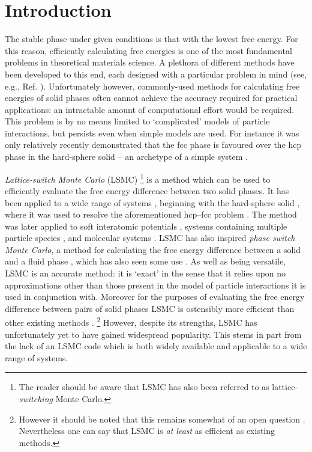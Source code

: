 \documentclass{report}
\begin{document}
\chapter{Introduction}
The stable phase under given conditions is that with the lowest free energy. For this reason, efficiently calculating free energies is one 
of the most fundamental problems in theoretical materials science. A plethora of different methods have been developed to this end, 
each designed with a particular problem in mind (see, e.g., Ref. \cite{book:Frenkel}). Unfortunately however, commonly-used methods for 
calculating free energies of solid phases often cannot achieve the accuracy required for practical applications: an intractable amount of computational 
effort would be required. This problem is by no means limited to `complicated' models of particle interactions, but 
persists even when simple models are used. For instance it was only relatively recently demonstrated that the fcc phase is
favoured over the hcp phase in the hard-sphere solid -- an archetype of a simple system \cite{Bruce_1997,Bruce_2000,Jackson_2002}.

\emph{Lattice-switch Monte Carlo} (LSMC) \cite{Bruce_1997,Bruce_2000} 
\footnote{The reader should be aware that LSMC has also been referred to as lattice-\emph{switching} Monte Carlo.}
is a method which can be used to efficiently evaluate the free energy difference between two solid phases.
It has been applied to a wide range of systems \cite{Bruce_1997,Pronk_1999,Mau_1999,Bruce_2000,Jackson_2002,Jackson_2007,Yang_2008,
Marechal_2008,Raiteri_2010,Wilms_2012,Quigley_2014,Bridgwater_2014,Underwood_2015},
beginning with the hard-sphere solid \cite{Bruce_1997,Pronk_1999,Mau_1999,Bruce_2000}, where it was used to resolve the aforementioned hcp--fcc problem 
\cite{Bruce_1997,Bruce_2000}. The method was later applied to soft interatomic potentials \cite{Jackson_2002,Wilms_2012,Underwood_2015}, 
systems containing multiple particle species \cite{Jackson_2007,Yang_2008}, and molecular systems 
\cite{Marechal_2008,Raiteri_2010,Quigley_2014,Bridgwater_2014}.
LSMC has also inspired \emph{phase switch Monte Carlo}, a method for calculating the free energy difference between a solid and a
fluid phase \cite{Wilding_2000}, which has also seen some use
\cite{Wilding_2000,Errington_2004,McNeil-Watson_2006,Wilding_2009_MP,Wilding_2009_JCP,Sollich_2010,Wilding_2010}.
%
As well as being versatile, LSMC is an accurate method: it is `exact' in the sense that it relies upon no approximations other than those present in 
the model of particle interactions it is used in conjunction with. Moreover for the purposes of evaluating the free energy difference between 
pairs of solid phases LSMC is ostensibly more efficient than other existing methods \cite{Wilms_2012,Marechal_2008}. 
\footnote{However it should be noted that this remains somewhat of an open question \cite{Pronk_1999,Sweatman_2015}. Nevertheless one can say that LSMC is 
\emph{at least} as efficient as existing methods.}
However, despite its strengths, LSMC has unfortunately yet to have gained widespread popularity. This stems in part from the lack of 
an LSMC code which is both widely available and applicable to a wide range of systems.
\end{document}
